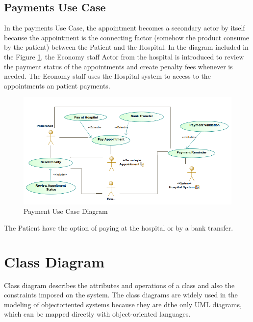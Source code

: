 \documentclass{article}
\begin{document}
            \subsection{Payments Use Case}

            In the payments Use Case, the appointment becomes a secondary actor by itself because the appointment is the connecting factor (somehow the product consume by the patient) between the Patient and the
            Hospital. In the diagram included in the Figure  \ref{fig:payment}, the Economy staff Actor from the hospital is introduced to review the payment status of the appointments and create penalty fees whenever is needed.
            The Economy staff uses the Hospital system to access to the appointments an patient payments.

            \begin{figure}[H]
                \centering 
                \includegraphics[width=1\linewidth]{./img/payments.png}
                \caption{Payment Use Case Diagram}
                \label{fig:payment}
            \end{figure}

            The Patient have the option of paying at the hospital or by a bank transfer.
            
            \section{Class Diagram} %
            Class diagram describes the attributes and operations of a class and also the constraints 
            imposed on the system. The class diagrams are widely used in the modeling of objectoriented 
            systems because they are dthe only UML diagrams, which can be mapped directly with object-oriented languages.
            
\end{document}
